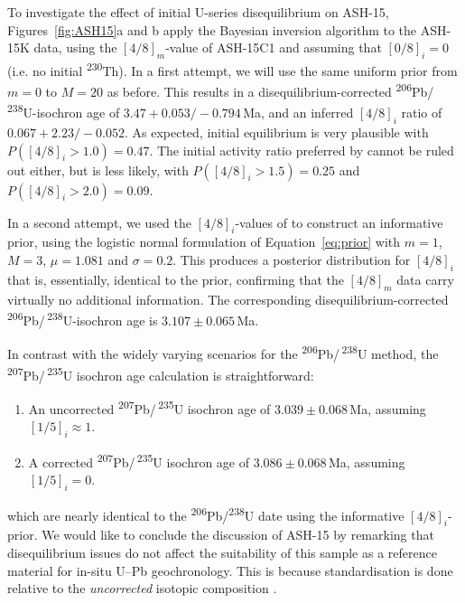 \documentclass{article}
\begin{document}
To investigate the effect of initial U-series disequilibrium on
ASH-15, Figures~\ref{fig:ASH15}a and b apply the Bayesian inversion
algorithm to the ASH-15K data, using the $[4/8]_m$-value of ASH-15C1
and assuming that $[0/8]_i=0$ (i.e. no initial
\textsuperscript{230}Th). In a first attempt, we will use the same
uniform prior from $m=0$ to $M=20$ as before. This results in a
disequilibrium-corrected
\textsuperscript{206}Pb/\,\textsuperscript{238}U-isochron age of
$3.47+0.053/-0.794$\,Ma, and an inferred $[4/8]_i$ ratio of
$0.067+2.23/-0.052$. As expected, initial equilibrium is very
plausible with $P([4/8]_i>1.0)=0.47$. The initial activity ratio
preferred by \citet{mason2013} cannot be ruled out either, but is less
likely, with $P([4/8]_i>1.5)=0.25$ and $P([4/8]_i>2.0)=0.09$.\medskip

In a second attempt, we used the $[4/8]_i$-values of
\citet{chaldekas2022} to construct an informative prior, using the
logistic normal formulation of Equation~\ref{eq:prior} with $m=1$,
$M=3$, $\mu=1.081$ and $\sigma=0.2$.  This produces a posterior
distribution for $[4/8]_i$ that is, essentially, identical to the
prior, confirming that the $[4/8]_m$ data carry virtually no
additional information. The corresponding disequilibrium-corrected
\textsuperscript{206}Pb/\,\textsuperscript{238}U-isochron age is
$3.107\pm{0.065}$\,Ma.\medskip

In contrast with the widely varying scenarios for the
\textsuperscript{206}Pb/\,\textsuperscript{238}U method, the
\textsuperscript{207}Pb/\,\textsuperscript{235}U isochron age
calculation is straightforward:

\begin{enumerate}
\item An uncorrected \textsuperscript{207}Pb/\,\textsuperscript{235}U
  isochron age of $3.039\pm0.068$\,Ma, assuming $[1/5]_i\approx{1}$.
\item A corrected \textsuperscript{207}Pb/\,\textsuperscript{235}U
  isochron age of $3.086\pm0.068$\,Ma, assuming $[1/5]_i=0$.
\end{enumerate}

\noindent which are nearly identical to the
\textsuperscript{206}Pb/\textsuperscript{238}U date using the
informative $[4/8]_i$-prior. We would like to conclude the
discussion of ASH-15 by remarking that disequilibrium issues do not
affect the suitability of this sample as a reference material for
in-situ U--Pb geochronology. This is because standardisation is done
relative to the \emph{uncorrected} isotopic composition
\citep{horstwood2016}.\medskip
\end{document}
